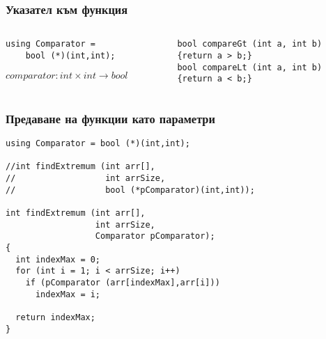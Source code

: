 \documentclass{beamer}
\begin{document}
\begin{frame}[fragile]
\frametitle{Указател към функция}

\begin{columns}[t]
  \begin{column}{0.5\textwidth}

\begin{flushleft}
\begin{lstlisting}
using Comparator = 
    bool (*)(int,int);
\end{lstlisting}  
\end{flushleft}

\vspace{15px}
$comparator: int \times int \rightarrow bool$

  \end{column}
  \begin{column}{0.5\textwidth}

\begin{flushleft}
\begin{lstlisting}
bool compareGt (int a, int b)
{return a > b;}
bool compareLt (int a, int b)
{return a < b;}
\end{lstlisting}  
\end{flushleft}

  \end{column}
\end{columns}

\end{frame}


\begin{frame}[fragile]
\frametitle{Предаване на функции като параметри}

\begin{flushleft}
\begin{lstlisting}
using Comparator = bool (*)(int,int);

//int findExtremum (int arr[], 
//                  int arrSize, 
//                  bool (*pComparator)(int,int));

int findExtremum (int arr[], 
                  int arrSize, 
                  Comparator pComparator);
{
  int indexMax = 0;
  for (int i = 1; i < arrSize; i++)
    if (pComparator (arr[indexMax],arr[i]))
      indexMax = i;

  return indexMax;
}
\end{lstlisting}  
\end{flushleft}

  
\end{frame}
\end{document}
